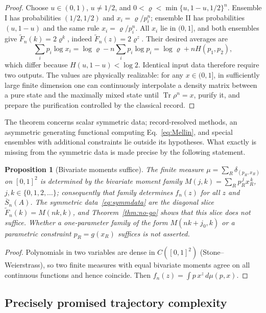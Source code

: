 \documentclass[aps,prx,reprint,superscriptaddress,nobibnotes,longbibliography]{revtex4-2}
\newtheorem{proposition}{Proposition}
\theoremstyle{remark}
\newcommand{\Tr}{\operatorname{Tr}}
\begin{document}
\begin{proof}
Choose $u\in(0,1)$, $u\ne1/2$, and
$0<\varrho<\min\{u,1-u,1/2\}^n$.  Ensemble I has probabilities $(1/2,1/2)$ and $x_i=\varrho/p_i^n$; ensemble II has probabilities $(u,1-u)$ and the same rule $x_i=\varrho/p_i^n$.  All $x_i$ lie in $(0,1]$, and both ensembles give
$\widetilde F_n(k)=2\varrho^k$, indeed $\widetilde F_n(z)=2\varrho^z$.  Their desired averages are
\begin{equation}
 \sum_i p_i\log x_i=\log\varrho-n\sum_i p_i\log p_i
 =\log\varrho+nH(p_1,p_2),
\end{equation}
which differ because $H(u,1-u)<\log2$.  Identical input data therefore require two outputs.  The values are physically realizable: for any $x\in(0,1]$, in sufficiently large finite dimension one can continuously interpolate a density matrix between a pure state and the maximally mixed state until $\Tr\rho^n=x$, purify it, and prepare the purification controlled by the classical record.
\end{proof}

The theorem concerns scalar symmetric data; record-resolved methods, an asymmetric generating functional computing Eq.~\eqref{eq:Mellin}, and special ensembles with additional constraints lie outside its hypotheses.  What exactly is missing from the symmetric data is made precise by the following statement.

\begin{proposition}[Bivariate moments suffice]
\label{prop:bivariate}
The finite measure $\mu=\sum_R\delta_{(p_R,x_R)}$ on $[0,1]^2$ is determined by the bivariate moment family $M(j,k)=\sum_Rp_R^{\,j}x_R^{\,k}$, $j,k\in\{0,1,2,\ldots\}$; consequently that family determines $f_n(z)$ for all $z$ and $\overline S_n(A)$.  The symmetric data~\eqref{eq:symmdata} are the diagonal slice $\widetilde F_n(k)=M(nk,k)$, and Theorem~\ref{thm:no-go} shows that this slice does not suffice.  Whether a one-parameter family of the form $M(nk+j_0,k)$ or a parametric constraint $p_R=g(x_R)$ suffices is not asserted.
\end{proposition}

\begin{proof}
Polynomials in two variables are dense in $C([0,1]^2)$ (Stone--Weierstrass), so two finite measures with equal bivariate moments agree on all continuous functions and hence coincide.  Then $f_n(z)=\int p\,x^z\,d\mu(p,x)$.
\end{proof}

\subsection{Precisely promised trajectory complexity}
\end{document}
